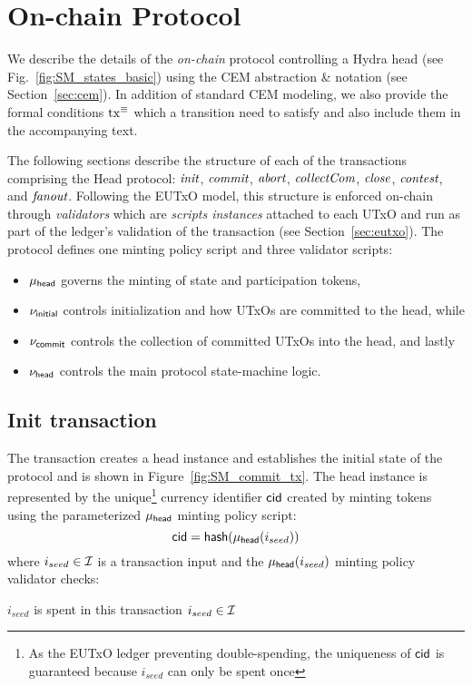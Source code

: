 \section{On-chain Protocol}\label{sec:on-chain}

We describe the details of the \emph{on-chain} protocol controlling a
Hydra head (see Fig.~\ref{fig:SM_states_basic}) using the CEM abstraction \&
notation (see Section~\ref{sec:cem}). In addition of standard CEM modeling, we
also provide the formal conditions $\mathrm{tx}^\equiv$ which a transition need to
satisfy and also include them in the accompanying text.

The following sections describe the structure of each of the transactions
comprising the Head protocol: $\textit{init}{}$, $\textit{commit}{}$, $\textit{abort}{}$,
$\textit{collectCom}{}$, $\textit{close}{}$, $\textit{contest}{}$, and $\textit{fanout}{}$. Following
the EUTxO model, this structure is enforced on-chain through \emph{validators}
which are \emph{scripts instances} attached to each UTxO and run as part of the
ledger's validation of the transaction (see Section~\ref{sec:eutxo}). The
protocol defines one minting policy script and three validator scripts:
\begin{itemize}
  \item $\mu_\mathsf{head}$ governs the minting of state and participation tokens,
  \item $\nu_\mathsf{initial}$ controls initialization and how UTxOs are committed to the head, while
  \item $\nu_\mathsf{commit}$ controls the collection of committed UTxOs into the head, and lastly
  \item $\nu_\mathsf{head}$ controls the main protocol state-machine logic.
\end{itemize}

\subsection{Init transaction}

The \mtxInit{} transaction creates a head instance and establishes the initial
state of the protocol and is shown in Figure~\ref{fig:SM_commit_tx}. The head
instance is represented by the unique\footnote{As the EUTxO ledger preventing
  double-spending, the uniqueness of $\mathsf{cid}$ is guaranteed because $i_{seed}$ can
  only be spent once} currency identifier $\mathsf{cid}$ created by minting tokens using
the parameterized $\mu_\mathsf{head}$ minting policy script:
\[
  \mathsf{cid} = \mathsf{hash}(\mu_\mathsf{head}(i_{seed}))
\]
\noindent where $i_{seed} \in \mathcal{I}$ is a transaction input and the
$\mu_\mathsf{head}(i_{seed})$ minting policy validator checks:
\begin{menumerate}
  \item $i_{seed}$ is spent in this transaction
  $i_{seed} \in \mathcal{I}$
\end{menumerate}

